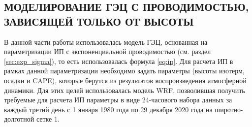 \subsection{МОДЕЛИРОВАНИЕ ГЭЦ С ПРОВОДИМОСТЬЮ, ЗАВИСЯЩЕЙ ТОЛЬКО ОТ ВЫСОТЫ}

В данной части работы использовалась модель ГЭЦ, основанная на параметризации ИП с экспоненциальной проводимостью (см. раздел \ref{sec:exp_sigma}), то есть использовалась формула \eqref{eq:ip}. Для расчета ИП в рамках данной параметризации необходимо задать параметры (высоты изотерм, осадки и CAPE), которые берутся из результатов воспроизведения атмосферной динамики. Для этих целей использовалась модель WRF, позволившая получить требуемые для расчета ИП параметры в виде 24-часового набора данных за каждый третий день с 1 января 1980 года по 29 декабря 2020 года на широтно-долготной сетке 1\textdegree{}\textdegree. 

